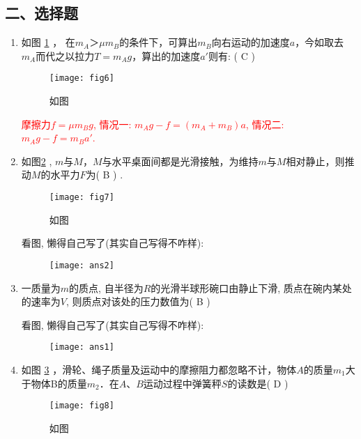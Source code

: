 \subsection*{二、选择题}
\begin{enumerate}
\item 如图 \ref{Fig:6} ， 在$m_A＞μm_B$的条件下，可算出$m_B$向右运动的加速度$a$，今如取去$m_A$而代之以拉力$T=m_Ag$，算出的加速度$a′$则有: ( C )
    \begin{figure}[H]
        \centering
        \texttt{[image: fig6]}
        \caption{如图}\label{Fig:6}
    \end{figure}
    \begin{note}
        \textcolor{red}{
        摩擦力$f = \mu m_B g$, 情况一: $m_Ag - f = (m_A + m_B)a$, 情况二: $m_Ag - f = m_B a{'}$.}
    \end{note}
\item 如图\ref{Fig:7} , $m$与$M$，$M$与水平桌面间都是光滑接触，为维持$m$与$M$相对静止，则推动$M$的水平力$F$为( B )
.
    \begin{figure}[H]
        \centering
        \texttt{[image: fig7]}
        \caption{如图}\label{Fig:7}
    \end{figure}
    \begin{note}
        看图, 懒得自己写了(其实自己写得不咋样):
    \end{note}
    \begin{figure}[H]
        \centering
        \texttt{[image: ans2]}
    \end{figure}
\item 一质量为$m$的质点, 自半径为$R$的光滑半球形碗口由静止下滑, 质点在碗内某处的速率为$V$, 则质点对该处的压力数值为( B )
\begin{note}
    看图, 懒得自己写了(其实自己写得不咋样):
\end{note}
\begin{figure}[H]
    \centering
    \texttt{[image: ans1]}
\end{figure}
\item 如图 \ref{Fig:8} ，滑轮、绳子质量及运动中的摩擦阻力都忽略不计，物体$A$的质量$m_1$大于物体B的质量$m_2$．在$A$、$B$运动过程中弹簧秤$S$的读数是( D )
    \begin{figure}[H]
        \centering
        \texttt{[image: fig8]}
        \caption{如图}\label{Fig:8}
    \end{figure}


\end{enumerate}
